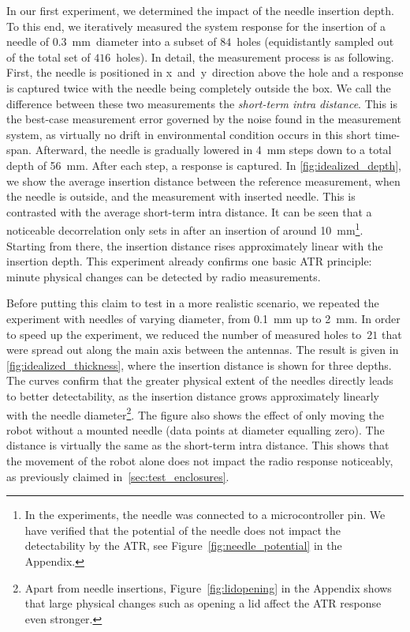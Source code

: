 \documentclass[conference]{IEEEtran}
\begin{document}
In our first experiment, we determined the impact of the needle insertion depth. To this end, we iteratively measured the system response for the insertion of a needle of \SI{0.3}{\mm}~diameter into a subset of $84$~holes (equidistantly sampled out of the total set of $416$~holes). In detail, the measurement process is as following. First, the needle is positioned in x~and~y~direction above the hole and a response is captured twice with the needle being completely outside the box. We call the difference between these two measurements the \textit{short-term intra distance}. This is the best-case measurement error governed by the noise found in the measurement system, as virtually no drift in environmental condition occurs in this short time-span. Afterward, the needle is gradually lowered in \SI{4}{\mm} steps down to a total depth of \SI{56}{\mm}. After each step, a response is captured. In \autoref{fig:idealized_depth}, we show the average insertion distance between the reference measurement, when the needle is outside, and the measurement with inserted needle. This is contrasted with the average short-term intra distance. It can be seen that a noticeable decorrelation only sets in after an insertion of around \SI{10}{\mm}\footnote{In the experiments, the needle was connected to a microcontroller pin. We have verified that the potential of the needle does not impact the detectability by the ATR, see Figure~\ref{fig:needle_potential} in the Appendix.}. Starting from there, the insertion distance rises approximately linear with the insertion depth. This experiment already confirms one basic ATR principle: minute physical changes can be detected by radio measurements. 

Before putting this claim to test in a more realistic scenario, we repeated the experiment with needles of varying diameter, from \SI{0.1}{\mm} up to \SI{2}{\mm}. In order to speed up the experiment, we reduced the number of measured holes to~$21$ that were spread out along the main axis between the antennas. The result is given in \autoref{fig:idealized_thickness}, where the insertion distance is shown for three depths. The curves confirm that the greater physical extent of the needles directly leads to better detectability, as the insertion distance grows approximately linearly with the needle diameter\footnote{Apart from needle insertions, Figure~\ref{fig:lidopening} in the Appendix shows that large physical changes such as opening a lid affect the ATR response even stronger.}. The figure also shows the effect of only moving the robot without a mounted needle (data points at diameter equalling zero). The distance is virtually the same as the short-term intra distance. This shows that the movement of the robot alone does not impact the radio response noticeably, as previously claimed in~\autoref{sec:test_enclosures}.
\end{document}
